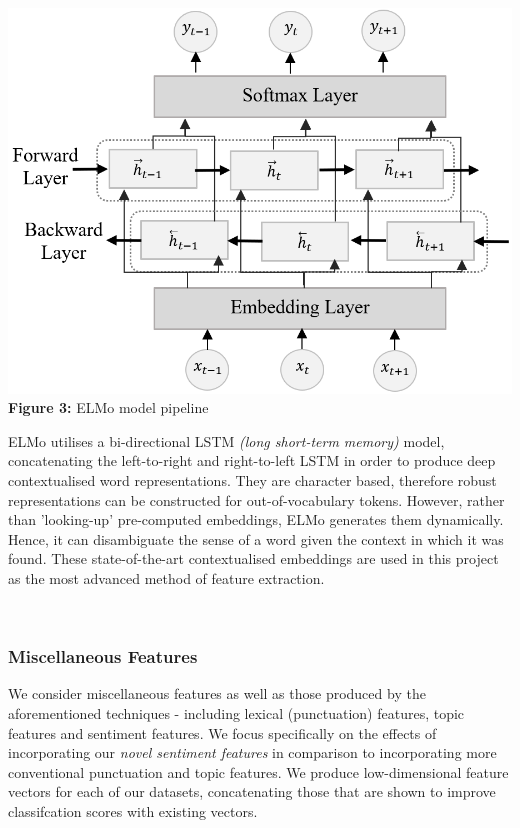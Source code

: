 \documentclass[12pt,a4paper]{article}
\begin{document}
\begin{minipage}{0.38\textwidth}
	 	\begin{center}
		\hspace{-1.5cm}\includegraphics[width=1.2\textwidth]{Images/elmo_diagram2.png}\\
		\hspace{-1cm}\textbf{Figure 3:} ELMo model pipeline\\
		\label{ELMo Model}
	\end{center}
\end{minipage} \hfill
\begin{minipage}{0.58\textwidth}
	  ELMo utilises a bi-directional LSTM \textit{(long short-term memory)} model, concatenating the left-to-right and right-to-left LSTM in order to produce deep contextualised word representations. They are character based, therefore robust representations can be constructed for out-of-vocabulary tokens. However, rather than 'looking-up' pre-computed embeddings, ELMo generates them dynamically. Hence, it can disambiguate the sense of a word given the context in which it was found. These state-of-the-art contextualised embeddings are used in this project as the most advanced method of feature extraction.
\end{minipage}\\

\subsubsection{Miscellaneous Features}
We consider miscellaneous features as well as those produced by the aforementioned techniques - including lexical (punctuation) features, topic features and sentiment features. We focus specifically on the effects of incorporating our \textit{novel sentiment features} in comparison to incorporating more conventional punctuation and topic features. We produce low-dimensional feature vectors for each of our datasets, concatenating those that are shown to improve classifcation scores with existing vectors.\\\vspace{-5pt}
\end{document}
